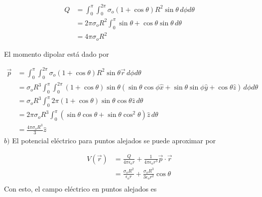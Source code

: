 \begin{equation}
\begin{split}
    Q &= \int^\pi_0\int^{2\pi}_0\sigma_o(1+\cos{\theta})
    R^2\sin{\theta}\,d\phi d\theta\\
    &= 2\pi\sigma_oR^2\int^\pi_0\sin{\theta}+\cos{\theta}
    \sin{\theta}\,d\theta\\
    &= 4\pi\sigma_oR^2
\end{split}
\nonumber
\end{equation}

El momento dipolar está dado por

\begin{equation}
\begin{split}
    \Vec{p} &= \int^\pi_0\int^{2\pi}_0\sigma_o(1+\cos{\theta})
    R^2\sin{\theta}\Vec{r}\,d\phi d\theta\\
    &= \sigma_oR^3\int^\pi_0\int^{2\pi}_0(1+\cos{\theta})
    \sin{\theta}(\sin{\theta}\cos{\phi}\hat{x}+\sin{\theta}
    \sin{\phi}\hat{y}+\cos{\theta}\hat{z})\,d\phi d\theta\\
    &= \sigma_oR^3\int^\pi_0 2\pi(1+\cos{\theta})\sin{\theta}
    \cos{\theta}\hat{z}\,d\theta\\
    &= 2\pi\sigma_oR^3\int^\pi_0 (\sin{\theta}\cos{\theta}+
    \sin{\theta}\cos^2{\theta})\hat{z}\,d\theta\\
    &= \frac{4\pi\sigma_oR^3}{3}\hat{z}
\end{split}
\nonumber
\end{equation}
\bigbreak
$b)$ El potencial eléctrico para puntos alejados se puede aproximar por

\begin{equation}
\begin{split}
    V(\Vec{r}) &= \frac{Q}{4\pi\epsilon_o r} + 
    \frac{1}{4\pi\epsilon_o r^3}\Vec{p}\cdot\Vec{r}\\
    &= \frac{\sigma_oR^2}{\epsilon_o r}+
    \frac{\sigma_oR^3}{3\epsilon_o r^2}\cos{\theta}\\
\end{split}
\nonumber
\end{equation}
\medbreak
Con esto, el campo eléctrico en puntos alejados es

